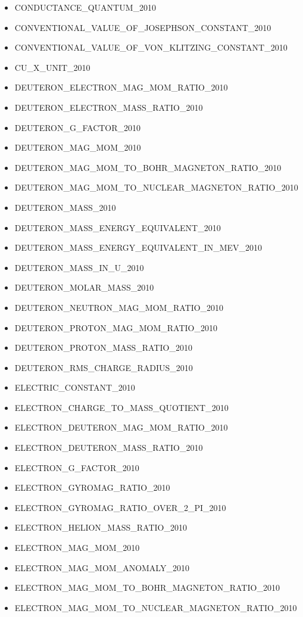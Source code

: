 \begin{itemize}
\item
  CONDUCTANCE\_QUANTUM\_2010
\item
  CONVENTIONAL\_VALUE\_OF\_JOSEPHSON\_CONSTANT\_2010
\item
  CONVENTIONAL\_VALUE\_OF\_VON\_KLITZING\_CONSTANT\_2010
\item
  CU\_X\_UNIT\_2010
\item
  DEUTERON\_ELECTRON\_MAG\_MOM\_RATIO\_2010
\item
  DEUTERON\_ELECTRON\_MASS\_RATIO\_2010
\item
  DEUTERON\_G\_FACTOR\_2010
\item
  DEUTERON\_MAG\_MOM\_2010
\item
  DEUTERON\_MAG\_MOM\_TO\_BOHR\_MAGNETON\_RATIO\_2010
\item
  DEUTERON\_MAG\_MOM\_TO\_NUCLEAR\_MAGNETON\_RATIO\_2010
\item
  DEUTERON\_MASS\_2010
\item
  DEUTERON\_MASS\_ENERGY\_EQUIVALENT\_2010
\item
  DEUTERON\_MASS\_ENERGY\_EQUIVALENT\_IN\_MEV\_2010
\item
  DEUTERON\_MASS\_IN\_U\_2010
\item
  DEUTERON\_MOLAR\_MASS\_2010
\item
  DEUTERON\_NEUTRON\_MAG\_MOM\_RATIO\_2010
\item
  DEUTERON\_PROTON\_MAG\_MOM\_RATIO\_2010
\item
  DEUTERON\_PROTON\_MASS\_RATIO\_2010
\item
  DEUTERON\_RMS\_CHARGE\_RADIUS\_2010
\item
  ELECTRIC\_CONSTANT\_2010
\item
  ELECTRON\_CHARGE\_TO\_MASS\_QUOTIENT\_2010
\item
  ELECTRON\_DEUTERON\_MAG\_MOM\_RATIO\_2010
\item
  ELECTRON\_DEUTERON\_MASS\_RATIO\_2010
\item
  ELECTRON\_G\_FACTOR\_2010
\item
  ELECTRON\_GYROMAG\_RATIO\_2010
\item
  ELECTRON\_GYROMAG\_RATIO\_OVER\_2\_PI\_2010
\item
  ELECTRON\_HELION\_MASS\_RATIO\_2010
\item
  ELECTRON\_MAG\_MOM\_2010
\item
  ELECTRON\_MAG\_MOM\_ANOMALY\_2010
\item
  ELECTRON\_MAG\_MOM\_TO\_BOHR\_MAGNETON\_RATIO\_2010
\item
  ELECTRON\_MAG\_MOM\_TO\_NUCLEAR\_MAGNETON\_RATIO\_2010

\end{itemize}
